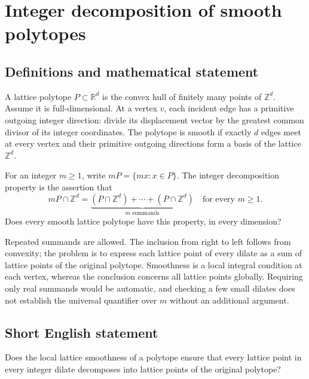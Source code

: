 \documentclass[11pt,a4paper]{article}
\begin{document}
\section*{Integer decomposition of smooth polytopes}\label{statement}

\subsection{Definitions and mathematical statement}
A lattice polytope $P\subset\mathbb R^d$ is the convex hull of finitely
many points of $\mathbb Z^d$. Assume it is full-dimensional.
At a vertex $v$, each incident edge has a primitive outgoing integer
direction: divide its displacement vector by the greatest common
divisor of its integer coordinates. The polytope is smooth if exactly
$d$ edges meet at every vertex and their primitive outgoing directions
form a basis of the lattice $\mathbb Z^d$.

For an integer $m\ge1$, write $mP=\{mx:x\in P\}$.
The integer decomposition property is the assertion that
\[
                  mP\cap\mathbb Z^d
                   =\underbrace{(P\cap\mathbb Z^d)+\cdots+
                                  (P\cap\mathbb Z^d)}_{m\text{ summands}}
                                      \quad\text{for every }m\ge1.
\]
Does every smooth lattice polytope have this property, in every dimension?

Repeated summands are allowed. The inclusion from right to left follows
from convexity; the problem is to express each lattice point of every
dilate as a sum of lattice points of the original polytope. Smoothness
is a local integral condition at each vertex, whereas the conclusion
concerns all lattice points globally. Requiring only real summands
would be automatic, and checking a few small dilates does not establish
the universal quantifier over $m$ without an additional argument.
\subsection{Short English statement}
Does the local lattice smoothness of a polytope ensure that every
lattice point in every integer dilate decomposes into lattice points of the original polytope?
\end{document}
